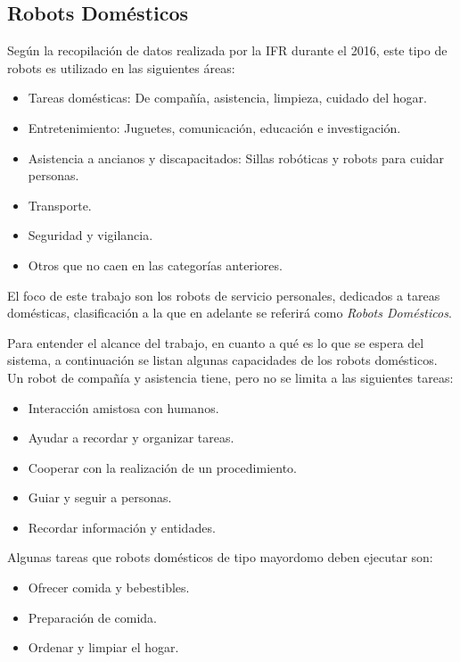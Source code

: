 \subsection{Robots Domésticos}\label{sec:domestic_robots}

Según la recopilación de datos realizada por la IFR durante el 2016, este tipo de robots es utilizado en las siguientes áreas:
\begin{itemize}[topsep=0pt]
\setlength\itemsep{0.2em}
\item Tareas domésticas: De compañía, asistencia, limpieza, cuidado del hogar.
\item Entretenimiento: Juguetes, comunicación, educación e investigación.
\item Asistencia a ancianos y discapacitados: Sillas robóticas y robots para cuidar personas.
\item Transporte.
\item Seguridad y vigilancia.
\item Otros que no caen en las categorías anteriores.
\end{itemize}
\bigskip

El foco de este trabajo son los robots de servicio personales, dedicados a tareas domésticas, clasificación a la que en  adelante se referirá como \textit{Robots Domésticos}.

Para entender el alcance del trabajo, en cuanto a qué es lo que se espera del sistema, a continuación se listan algunas capacidades de los robots domésticos. Un robot de compañía y asistencia tiene, pero no se limita a las siguientes tareas:
\begin{itemize}[topsep=0pt]
\setlength\itemsep{0.2em}
\item Interacción amistosa con humanos.
\item Ayudar a recordar y organizar tareas.
\item Cooperar con la realización de un procedimiento.
\item Guiar y seguir a personas.
\item Recordar información y entidades.
\end{itemize}
\bigskip

Algunas tareas que robots domésticos de tipo mayordomo deben ejecutar son:
\begin{itemize}[topsep=0pt]
\setlength\itemsep{0.2em}
\item Ofrecer comida y bebestibles.
\item Preparación de comida.
\item Ordenar y limpiar el hogar.
\end{itemize}
\bigskip


